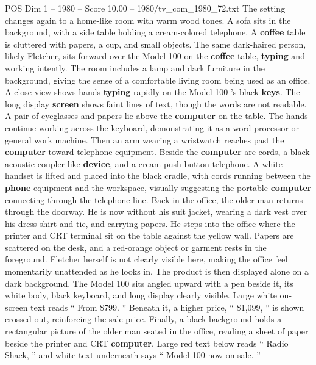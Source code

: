 \begin{textsample}{POS Dim 1 – 1980 – Score 10.00 – 1980/tv\_com\_1980\_72.txt}
The setting changes again to a home-like room with warm wood tones.
A sofa sits in the background, with a side table holding a cream-colored telephone.
A \textbf{coffee} table is cluttered with papers, a cup, and small objects.
The same dark-haired person, likely Fletcher, sits forward over the Model 100 on the \textbf{coffee} table, \textbf{typing} and working intently.
The room includes a lamp and dark furniture in the background, giving the sense of a comfortable living room being used as an office.
A close view shows hands \textbf{typing} rapidly on the Model 100 ’s black \textbf{keys}.
The long display \textbf{screen} shows faint lines of text, though the words are not readable.
A pair of eyeglasses and papers lie above the \textbf{computer} on the table.
The hands continue working across the keyboard, demonstrating it as a word processor or general work machine.
Then an arm wearing a wristwatch reaches past the \textbf{computer} toward telephone equipment.
Beside the \textbf{computer} are cords, a black acoustic coupler-like \textbf{device}, and a cream push-button telephone.
A white handset is lifted and placed into the black cradle, with cords running between the \textbf{phone} equipment and the workspace, visually suggesting the portable \textbf{computer} connecting through the telephone line.
Back in the office, the older man returns through the doorway.
He is now without his suit jacket, wearing a dark vest over his dress shirt and tie, and carrying papers.
He steps into the office where the printer and CRT terminal sit on the table against the yellow wall.
Papers are scattered on the desk, and a red-orange object or garment rests in the foreground.
Fletcher herself is not clearly visible here, making the office feel momentarily unattended as he looks in.
The product is then displayed alone on a dark background.
The Model 100 sits angled upward with a pen beside it, its white body, black keyboard, and long display clearly visible.
Large white on-screen text reads “ From \$799. ” Beneath it, a higher price, “ \$1,099, ” is shown crossed out, reinforcing the sale price.
Finally, a black background holds a rectangular picture of the older man seated in the office, reading a sheet of paper beside the printer and CRT \textbf{computer}.
Large red text below reads “ Radio Shack, ” and white text underneath says “ Model 100 now on sale. ”

\end{textsample}
